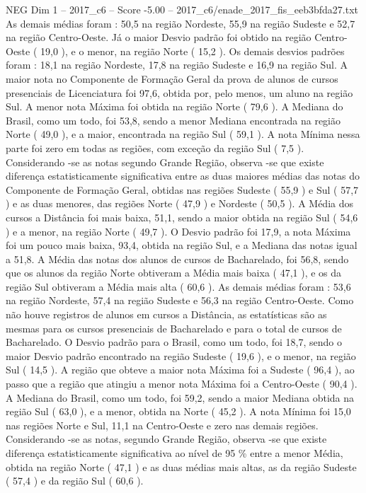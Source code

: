 \begin{textsample}{NEG Dim 1 – 2017\_c6 – Score -5.00 – 2017\_c6/enade\_2017\_fis\_eeb3bfda27.txt}
As demais médias foram : 50,5 na região Nordeste, 55,9 na região Sudeste e 52,7 na região Centro-Oeste.
Já o maior Desvio padrão foi obtido na região Centro-Oeste ( 19,0 ), e o menor, na região Norte ( 15,2 ).
Os demais desvios padrões foram : 18,1 na região Nordeste, 17,8 na região Sudeste e 16,9 na região Sul.
A maior nota no Componente de Formação Geral da prova de alunos de cursos presenciais de Licenciatura foi 97,6, obtida por, pelo menos, um aluno na região Sul.
A menor nota Máxima foi obtida na região Norte ( 79,6 ).
A Mediana do Brasil, como um todo, foi 53,8, sendo a menor Mediana encontrada na região Norte ( 49,0 ), e a maior, encontrada na região Sul ( 59,1 ).
A nota Mínima nessa parte foi zero em todas as regiões, com exceção da região Sul ( 7,5 ).
Considerando -se as notas segundo Grande Região, observa -se que existe diferença estatisticamente significativa entre as duas maiores médias das notas do Componente de Formação Geral, obtidas nas regiões Sudeste ( 55,9 ) e Sul ( 57,7 ) e as duas menores, das regiões Norte ( 47,9 ) e Nordeste ( 50,5 ).
A Média dos cursos a Distância foi mais baixa, 51,1, sendo a maior obtida na região Sul ( 54,6 ) e a menor, na região Norte ( 49,7 ).
O Desvio padrão foi 17,9, a nota Máxima foi um pouco mais baixa, 93,4, obtida na região Sul, e a Mediana das notas igual a 51,8.
A Média das notas dos alunos de cursos de Bacharelado, foi 56,8, sendo que os alunos da região Norte obtiveram a Média mais baixa ( 47,1 ), e os da região Sul obtiveram a Média mais alta ( 60,6 ).
As demais médias foram : 53,6 na região Nordeste, 57,4 na região Sudeste e 56,3 na região Centro-Oeste.
Como não houve registros de alunos em cursos a Distância, as estatísticas são as mesmas para os cursos presenciais de Bacharelado e para o total de cursos de Bacharelado.
O Desvio padrão para o Brasil, como um todo, foi 18,7, sendo o maior Desvio padrão encontrado na região Sudeste ( 19,6 ), e o menor, na região Sul ( 14,5 ).
A região que obteve a maior nota Máxima foi a Sudeste ( 96,4 ), ao passo que a região que atingiu a menor nota Máxima foi a Centro-Oeste ( 90,4 ).
A Mediana do Brasil, como um todo, foi 59,2, sendo a maior Mediana obtida na região Sul ( 63,0 ), e a menor, obtida na Norte ( 45,2 ).
A nota Mínima foi 15,0 nas regiões Norte e Sul, 11,1 na Centro-Oeste e zero nas demais regiões.
Considerando -se as notas, segundo Grande Região, observa -se que existe diferença estatisticamente significativa ao nível de 95 \% entre a menor Média, obtida na região Norte ( 47,1 ) e as duas médias mais altas, as da região Sudeste ( 57,4 ) e da região Sul ( 60,6 ).

\end{textsample}
